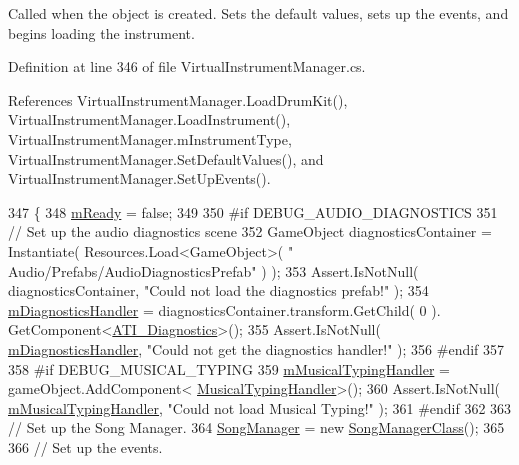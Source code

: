 Called when the object is created. Sets the default values, sets up the events, and begins loading the instrument. 



Definition at line 346 of file Virtual\+Instrument\+Manager.\+cs.



References Virtual\+Instrument\+Manager.\+Load\+Drum\+Kit(), Virtual\+Instrument\+Manager.\+Load\+Instrument(), Virtual\+Instrument\+Manager.\+m\+Instrument\+Type, Virtual\+Instrument\+Manager.\+Set\+Default\+Values(), and Virtual\+Instrument\+Manager.\+Set\+Up\+Events().


\begin{DoxyCode}
347     \{
348         \hyperlink{group___v_i_m_priv_ga983a11920bf16794735cc193c327ac42}{mReady} = \textcolor{keyword}{false};
349 
350 \textcolor{preprocessor}{        #if DEBUG\_AUDIO\_DIAGNOSTICS}
351             \textcolor{comment}{// Set up the audio diagnostics scene}
352             GameObject diagnosticsContainer = Instantiate( Resources.Load<GameObject>( \textcolor{stringliteral}{"
      Audio/Prefabs/AudioDiagnosticsPrefab"} ) );
353             Assert.IsNotNull( diagnosticsContainer, \textcolor{stringliteral}{"Could not load the diagnostics prefab!"} );
354             \hyperlink{group___v_i_m_priv_gafabe4a874fc21f7bcedf431df3b94201}{mDiagnosticsHandler} = diagnosticsContainer.transform.GetChild( 0 ).
      GetComponent<\hyperlink{group___audio_testing_class_a_t_i___diagnostics}{ATI\_Diagnostics}>();
355             Assert.IsNotNull( \hyperlink{group___v_i_m_priv_gafabe4a874fc21f7bcedf431df3b94201}{mDiagnosticsHandler}, \textcolor{stringliteral}{"Could not get the diagnostics
       handler!"} );
356 \textcolor{preprocessor}{        #endif}
357 
358 \textcolor{preprocessor}{        #if DEBUG\_MUSICAL\_TYPING}
359             \hyperlink{group___v_i_m_priv_gad7b95bd21383d11ea0cbf33d79b78e09}{mMusicalTypingHandler} = gameObject.AddComponent<
      \hyperlink{class_musical_typing_handler}{MusicalTypingHandler}>();
360             Assert.IsNotNull( \hyperlink{group___v_i_m_priv_gad7b95bd21383d11ea0cbf33d79b78e09}{mMusicalTypingHandler}, \textcolor{stringliteral}{"Could not load Musical Typing!"} 
      );
361 \textcolor{preprocessor}{        #endif}
362 
363         \textcolor{comment}{// Set up the Song Manager.}
364         \hyperlink{group___v_i_m_pub_ga33dae94932c10c66db76a0eebec76b01}{SongManager} = \textcolor{keyword}{new} \hyperlink{class_song_manager_class}{SongManagerClass}();
365 
366         \textcolor{comment}{// Set up the events.}

\end{DoxyCode}

